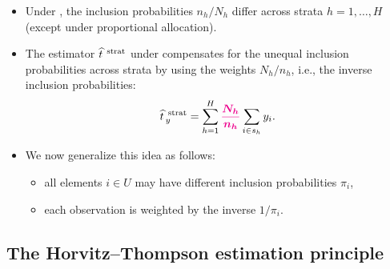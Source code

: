 \documentclass{my_eth_beamer}
\numberwithin{equation}{section}
\begin{document}
\begin{frame}
    \begin{itemize}
    \setlength{\itemsep}{12pt}
        \item Under \STSI, the inclusion probabilities $n_h/N_h$ \alert{differ
            across strata} $h=1,\ldots,H$ (except under proportional
            allocation).
        \item The estimator $\widehat{t}^{\;\, \mathrm{strat}}_{\,}$ under \STSI \alert{compensates} for
            the unequal inclusion probabilities across strata by using the
            \alert{weights} $N_h/n_h$, i.e., the \alert{inverse inclusion
            probabilities}:
            \begin{equation*}
                \widehat{t}^{\;\, \mathrm{strat}}_{\,y} = \sum_{h = 1}^H
                    {\color{magenta}\frac{\bm{N_h}}{\bm{n_h}}} \sum_{i \in s_h}
                    y_i.
            \end{equation*}
        \item We now \alert{generalize} this idea as follows:
            \vspace{0.25em}
            \begin{itemize}
            \setlength{\itemsep}{6pt}
                \item \alert{all} elements $i \in U$ may have \alert{different}
                    inclusion probabilities $\pi_i$,
                \item each observation is \alert{weighted} by the
                    \alert{inverse} $1/\pi_i$.
            \end{itemize}
    \end{itemize}
\end{frame}

\subsection{The Horvitz--Thompson estimation principle}
\end{document}
